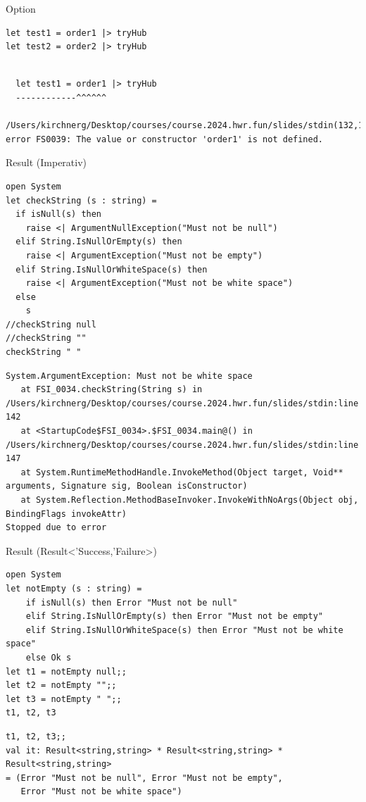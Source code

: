 \documentclass[t]{beamer}
\begin{document}
\begin{frame}[label={sec:org1497c96},fragile]{Option}
 \begin{verbatim}
let test1 = order1 |> tryHub
let test2 = order2 |> tryHub
\end{verbatim}

\begin{verbatim}

  let test1 = order1 |> tryHub
  ------------^^^^^^

/Users/kirchnerg/Desktop/courses/course.2024.hwr.fun/slides/stdin(132,13): error FS0039: The value or constructor 'order1' is not defined.
\end{verbatim}
\end{frame}

\begin{frame}[label={sec:org63c35de},fragile]{Result (Imperativ)}
 \begin{verbatim}
open System
let checkString (s : string) =
  if isNull(s) then
    raise <| ArgumentNullException("Must not be null")
  elif String.IsNullOrEmpty(s) then
    raise <| ArgumentException("Must not be empty")
  elif String.IsNullOrWhiteSpace(s) then
    raise <| ArgumentException("Must not be white space")
  else
    s
//checkString null
//checkString ""
checkString " "
\end{verbatim}

\begin{verbatim}
System.ArgumentException: Must not be white space
   at FSI_0034.checkString(String s) in /Users/kirchnerg/Desktop/courses/course.2024.hwr.fun/slides/stdin:line 142
   at <StartupCode$FSI_0034>.$FSI_0034.main@() in /Users/kirchnerg/Desktop/courses/course.2024.hwr.fun/slides/stdin:line 147
   at System.RuntimeMethodHandle.InvokeMethod(Object target, Void** arguments, Signature sig, Boolean isConstructor)
   at System.Reflection.MethodBaseInvoker.InvokeWithNoArgs(Object obj, BindingFlags invokeAttr)
Stopped due to error
\end{verbatim}
\end{frame}

\begin{frame}[label={sec:orge75c8d0},fragile]{Result (Result<'Success,'Failure>)}
 \begin{verbatim}
open System
let notEmpty (s : string) =
    if isNull(s) then Error "Must not be null"
    elif String.IsNullOrEmpty(s) then Error "Must not be empty"
    elif String.IsNullOrWhiteSpace(s) then Error "Must not be white space"
    else Ok s
let t1 = notEmpty null;;
let t2 = notEmpty "";;
let t3 = notEmpty " ";;
t1, t2, t3
\end{verbatim}

\begin{verbatim}
t1, t2, t3;;
val it: Result<string,string> * Result<string,string> * Result<string,string>
= (Error "Must not be null", Error "Must not be empty",
   Error "Must not be white space")
\end{verbatim}
\end{frame}
\end{document}
